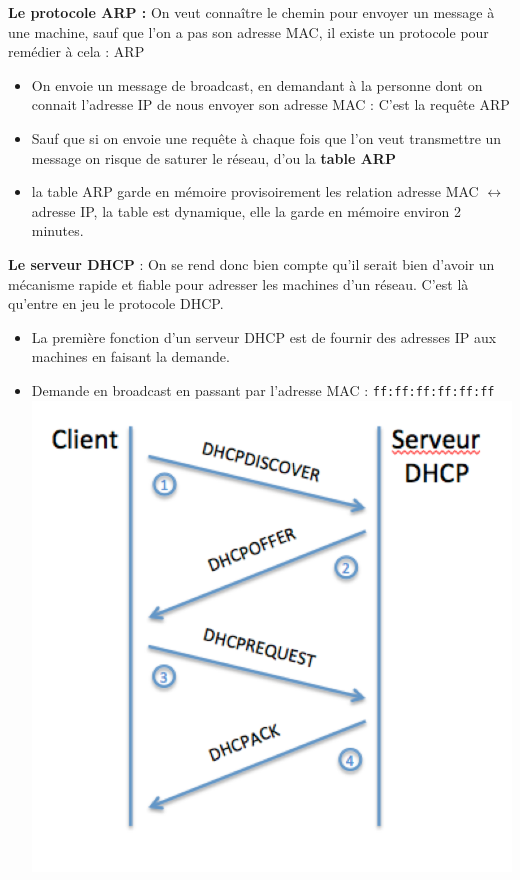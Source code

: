 \documentclass[a4paper,9pt, twocolumn]{article}
\begin{document}
	\textbf{Le protocole ARP :} On veut connaître le chemin pour envoyer un message à une machine, sauf que l'on a pas son adresse MAC, il existe un protocole pour remédier à cela : ARP
	\begin{itemize}
		\item On envoie un message de broadcast, en demandant à la personne dont on connait l'adresse IP de nous envoyer son adresse MAC : C'est la requête ARP
		\item Sauf que si on envoie une requête à chaque fois que l'on veut transmettre un message on risque de saturer le réseau, d'ou la \textbf{table ARP}
		\item la table ARP garde en mémoire provisoirement les relation adresse MAC $\longleftrightarrow$ adresse IP, la table est dynamique, elle la garde en mémoire environ 2 minutes.
		\end{itemize}
		\textbf{Le serveur DHCP} : On se rend donc bien compte qu'il serait bien d'avoir un mécanisme rapide et fiable pour adresser les machines d'un réseau. C'est là qu'entre en jeu le protocole DHCP.
		\begin{itemize}
		\item La première fonction d'un serveur DHCP est de fournir des adresses IP  aux machines en faisant la demande.
		\item Demande en broadcast en passant par l'adresse MAC : \texttt{ff:ff:ff:ff:ff:ff}
			\includegraphics[scale=0.4]{dhcp.png}
	\end{itemize}
	
\end{document}
